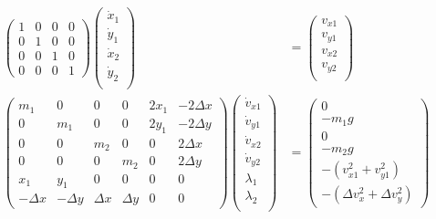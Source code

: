 \begin{align}
    \begin{pmatrix}
        1 & 0 & 0 & 0 \\
        0 & 1 & 0 & 0 \\
        0 & 0 & 1 & 0 \\
        0 & 0 & 0 & 1
    \end{pmatrix}
    \begin{pmatrix}
        \dot{x}_1 \\
        \dot{y}_1 \\
        \dot{x}_2 \\
        \dot{y}_2 \\
    \end{pmatrix}
    &=
    \begin{pmatrix}
        v_{x1} \\
        v_{y1} \\
        v_{x2} \\
        v_{y2} \\
    \end{pmatrix} \\
    \begin{pmatrix}
    m_1 & 0 & 0 & 0 & 2x_1 & -2\Delta x \\
    0 & m_1 & 0 & 0 & 2y_1 & -2\Delta y \\
    0 & 0 & m_2 & 0 & 0 & 2\Delta x \\
    0 & 0 & 0 & m_2 & 0 & 2\Delta y \\
    x_1 & y_1 & 0 & 0 & 0 & 0 \\
    -\Delta x & -\Delta y & \Delta x & \Delta y & 0 & 0
    \end{pmatrix}
    \begin{pmatrix}
        \dot{v}_{x1} \\
        \dot{v}_{y1} \\
        \dot{v}_{x2} \\
        \dot{v}_{y2} \\
        \lambda_1 \\
        \lambda_2 \\
    \end{pmatrix}
    &=
    \begin{pmatrix}
        0 \\
        -m_1g \\
        0 \\
        -m_2g \\
        -\left(v_{x1}^2 + v_{y1}^2 \right) \\
        -\left(\Delta v_x^2 + \Delta v_y^2 \right)
    \end{pmatrix}
\end{align}



